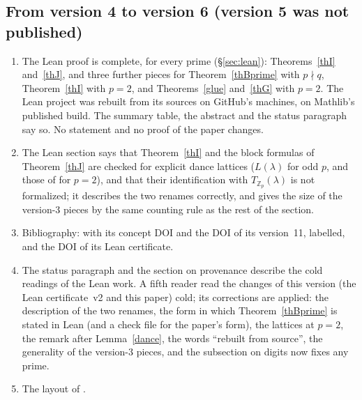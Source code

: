 \documentclass[10pt]{article}
\theoremstyle{ds}
\theoremstyle{dsrem}
\newcommand{\Z}{\mathbb{Z}}
\begin{document}
\subsection*{From version 4 to version 6 (version 5 was not published)}
\begin{enumerate}
\item The Lean proof is complete, for every prime (\S\ref{sec:lean}): Theorems~\ref{thI} and~\ref{thJ}, and three further pieces for Theorem~\ref{thBprime} with $p\nmid q$, Theorem~\ref{thI} with $p=2$, and Theorems~\ref{glue} and~\ref{thG} with $p=2$. The Lean project was rebuilt from its sources on GitHub's machines, on Mathlib's published build. The summary table, the abstract and the status paragraph say so. No statement and no proof of the paper changes.
\item The Lean section says that Theorem~\ref{thI} and the block formulas of Theorem~\ref{thJ} are checked for explicit dance lattices ($L(\lambda)$ for odd $p$, and those of \cite{DST} for $p=2$), and that their identification with $T_{\Z_p}(\lambda)$ is not formalized; it describes the two renames correctly, and gives the size of the version-3 pieces by the same counting rule as the rest of the section.
\item Bibliography: \cite{DST} with its concept DOI and the DOI of its version~11, labelled, and the DOI of its Lean certificate.
\item The status paragraph and the section on provenance describe the cold readings of the Lean work. A fifth reader read the changes of this version (the Lean certificate~v2 and this paper) cold; its corrections are applied: the description of the two renames, the form in which Theorem~\ref{thBprime} is stated in Lean (and a check file for the paper's form), the lattices at $p=2$, the remark after Lemma~\ref{dance}, the words ``rebuilt from source'', the generality of the version-3 pieces, and the subsection on digits now fixes any prime.
\item The layout of \cite{DST}.
\end{enumerate}
\end{document}
